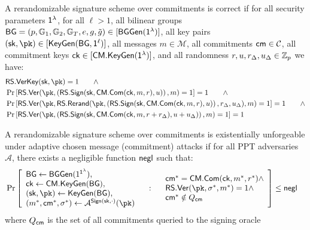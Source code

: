 \begin{definition}[Correctness] 
A rerandomizable signature scheme over commitments is correct if for all security parameters $\mathsf{1^{\lambda}}$, for all $\ell > 1$, all bilinear groups $\mathsf{BG} = (p, \mathbb{G}_1, \mathbb{G}_2, \mathbb{G}_T, e, g, \tilde{g}) \in [\mathsf{BGGen}(\mathsf{1^{\lambda}})]$, all key pairs $(\sk, \pk) \in [\mathsf{KeyGen}(\mathsf{BG, 1^{\ell}})]$, all messages $m \in \mathcal{M}$, all commitments $\mathsf{cm} \in \mathcal{C}$, all commitment keys $\mathsf{ck} \in [\mathsf{CM.KeyGen}(\mathsf{1^{\lambda}})]$, and all randomness $r, u, r_\Delta, u_\Delta \in \mathbb{Z}_p$ we have:
    \begin{align*}
        &\mathsf{RS.VerKey}(\sk, \pk) = 1 \qquad \wedge \\
        &\Pr \left[ \mathsf{RS.Ver}(\pk, \left(\mathsf{RS.Sign}(\mathsf{sk}, \mathsf{CM.Com}(\mathsf{ck}, m, r), u)\right), m) = 1 \right] =1 \qquad \wedge \\
        &\Pr \left[ \mathsf{RS.Ver}(\pk, \mathsf{RS.Rerand}(\pk,\left(\mathsf{RS.Sign}(\mathsf{sk}, \mathsf{CM.Com}(\mathsf{ck}, m, r), u)\right),r_\Delta, u_\Delta), m) = 1 \right] =1 \qquad \wedge \\
        &\Pr \left[ \mathsf{RS.Ver}(\pk, \left(\mathsf{RS.Sign}(\mathsf{sk}, \mathsf{CM.Com}(\mathsf{ck}, m, r+r_\Delta), u+u_\Delta)\right), m) = 1 \right] = 1\\
    \end{align*}
\end{definition}



\begin{definition}
A rerandomizable signature scheme over commitments is existentially unforgeable under adaptive chosen message (commitment) attacks if for all PPT adversaries $\mathcal{A}$, there exists a negligible function $\mathsf{negl}$ such that:
    \begin{align*}
        &\Pr\left[
            \begin{array}{l}
                \mathsf{BG} \gets \mathsf{BGGen}(1^{\secparam}), \\
                \mathsf{ck} \gets \mathsf{CM.KeyGen}(\mathsf{BG}), \\
                (\sk, \pk) \gets \mathsf{KeyGen}(\mathsf{BG}), \\
                (m^*, \cm^*, \sigma^*) \gets \mathcal{A}^{\mathsf{Sign}(\sk, \cdot)}(\pk) \\
                \end{array}
                \quad : \quad
                \begin{array}{l}
                \cm^* = \mathsf{CM.Com}(\mathsf{ck}, m^*, r^*) \land \\
                \mathsf{RS.Ver}(\pk, \sigma^*, m^*) = 1 \land \\
                \cm^* \notin Q_{\cm}
            \end{array}
        \right] \leq \negl
    \end{align*}
where $Q_{\mathsf{cm}}$ is the set of all commitments queried to the signing oracle
\end{definition}


